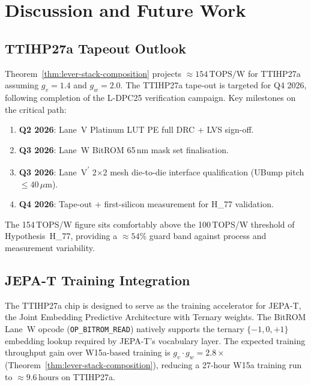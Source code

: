 \section{Discussion and Future Work}
\label{sec:flos77-discussion}

\subsection{TTIHP27a Tapeout Outlook}

Theorem~\ref{thm:lever-stack-composition} projects $\approx 154\,\text{TOPS/W}$
for TTIHP27a assuming $g_v = 1.4$ and $g_w = 2.0$.
The TTIHP27a tape-out is targeted for Q4 2026, following completion of the
L-DPC25 verification campaign.
Key milestones on the critical path:
%
\begin{enumerate}
  \item \textbf{Q2 2026}: Lane~V Platinum LUT PE full DRC + LVS sign-off.
  \item \textbf{Q3 2026}: Lane~W BitROM 65\,nm mask set finalisation.
  \item \textbf{Q3 2026}: Lane~V\textsuperscript{$\prime$} 2$\times$2 mesh die-to-die
        interface qualification (UBump pitch $\leq 40\,\mu\text{m}$).
  \item \textbf{Q4 2026}: Tape-out + first-silicon measurement for H\_77 validation.
\end{enumerate}

The 154\,TOPS/W figure sits comfortably above the 100\,TOPS/W threshold
of Hypothesis~H\_77, providing a $\approx 54\%$ guard band against process and
measurement variability.

\subsection{JEPA-T Training Integration}

The TTIHP27a chip is designed to serve as the training accelerator for JEPA-T,
the Joint Embedding Predictive Architecture with Ternary weights.
The BitROM Lane~W opcode (\texttt{OP\_BITROM\_READ}) natively supports the
ternary $\{-1, 0, +1\}$ embedding lookup required by JEPA-T's vocabulary layer.
The expected training throughput gain over W15a-based training is
$g_v \cdot g_w = 2.8\times$ (Theorem~\ref{thm:lever-stack-composition}),
reducing a 27-hour W15a training run to $\approx 9.6\,\text{hours}$ on TTIHP27a.

